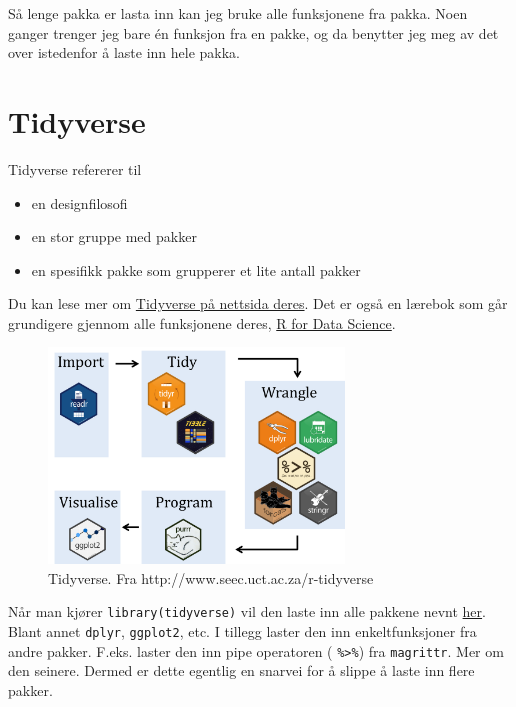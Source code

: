 \documentclass[
  letterpaper,
  DIV=11,
  numbers=noendperiod]{scrreprt}
\providecommand{\tightlist}{%
  \setlength{\itemsep}{0pt}\setlength{\parskip}{0pt}}\usepackage{longtable,booktabs,array}
\begin{document}
Så lenge pakka er lasta inn kan jeg bruke alle funksjonene fra pakka.
Noen ganger trenger jeg bare én funksjon fra en pakke, og da benytter
jeg meg av det over istedenfor å laste inn hele pakka.

\hypertarget{tidyverse}{%
\section{Tidyverse}\label{tidyverse}}

Tidyverse refererer til

\begin{itemize}
\tightlist
\item
  en designfilosofi
\item
  en stor gruppe med pakker
\item
  en spesifikk pakke som grupperer et lite antall pakker
\end{itemize}

Du kan lese mer om \href{https://www.tidyverse.org/}{Tidyverse på
nettsida deres}. Det er også en lærebok som går grundigere gjennom alle
funksjonene deres, \href{https://r4ds.had.co.nz/}{R for Data Science}.

\begin{figure}

{\centering \includegraphics[width=0.7\textwidth,height=\textheight]{./img/tidy_workflow.png}

}

\caption{Tidyverse. Fra http://www.seec.uct.ac.za/r-tidyverse}

\end{figure}

Når man kjører \texttt{library(tidyverse)} vil den laste inn alle
pakkene nevnt \href{https://www.tidyverse.org/packages/}{her}. Blant
annet \texttt{dplyr}, \texttt{ggplot2}, etc. I tillegg laster den inn
enkeltfunksjoner fra andre pakker. F.eks. laster den inn pipe operatoren
( \texttt{\%\textgreater{}\%}) fra \texttt{magrittr}. Mer om den
seinere. Dermed er dette egentlig en snarvei for å slippe å laste inn
flere pakker.
\end{document}
